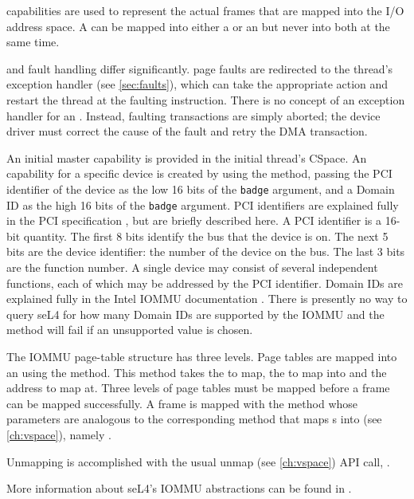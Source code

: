  capabilities are used to represent the actual frames that are
mapped into the I/O address space. A  can be mapped into
either a  or an  but never into both at the same time.

 and  fault handling differ significantly.
 page faults are redirected to the thread's exception handler (see \autoref{sec:faults}), 
which can take the
appropriate action and restart the thread at the faulting instruction.
There is no concept of an exception handler for an . Instead, faulting
transactions are simply
aborted; the device driver must correct the cause of the fault and retry
the DMA transaction.

An initial master  capability is provided in the initial thread's
CSpace. An  capability for a specific device is created by
using the  method, passing the
PCI identifier of the device as the low 16 bits of the \texttt{badge} argument, and
a Domain ID as the high 16 bits of the \texttt{badge} argument.
PCI identifiers are explained fully in the PCI specification 
\cite{Shanley:PCISA}, but are briefly described here. A PCI identifier is
a 16-bit quantity.  The first 8 bits identify the bus that the device is on.
The next 5 bits are the device identifier: the number of the device on
the bus. The last 3 bits are the function number. A single device may
consist of several independent functions, each of which may be addressed
by the PCI identifier.
Domain IDs are explained fully in the Intel IOMMU documentation \cite{extra:vtd}.
There is presently no way to query seL4 for how many Domain IDs are supported by
the IOMMU and the  method will fail if an
unsupported value is chosen.

The IOMMU page-table structure has three levels.
Page tables are mapped into an  using the  method.
This method takes the  to map, the  to map into 
and the address to map at. Three levels of page tables must be mapped before
a frame can be mapped successfully. A frame is mapped with the
 method whose parameters are analogous to
the corresponding method that maps s into  (see \autoref{ch:vspace}), 
namely .

Unmapping is accomplished with the usual unmap (see \autoref{ch:vspace}) API 
call,
.

More information about seL4's IOMMU abstractions can be found in \cite{Palande:M}.
\fi
